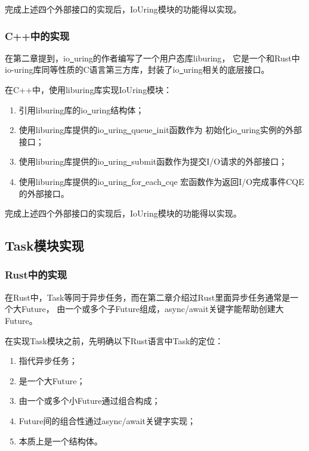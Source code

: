 \documentclass[supercite]{HustGraduPaper}
\theoremstyle{definition}
\begin{document}
完成上述四个外部接口的实现后，IoUring模块的功能得以实现。\par

\subsubsection{C++中的实现}

在第二章提到，io\underline{~}uring的作者编写了一个用户态库liburing\cite{liburing.org}，
它是一个和Rust中io-uring库同等性质的C语言第三方库，封装了io\underline{~}uring相关的底层接口。\par

在C++中，使用liburing库实现IoUring模块：

\begin{enumerate}[label={(\arabic*)}]
  \item 引用liburing库的io\underline{~}uring结构体；
  \item 使用liburing库提供的io\underline{~}uring\underline{~}queue\underline{~}init函数作为
    初始化io\underline{~}uring实例的外部接口；
  \item 使用liburing库提供的io\underline{~}uring\underline{~}submit函数作为提交I/O请求的外部接口；
  \item 使用liburing库提供的io\underline{~}uring\underline{~}for\underline{~}each\underline{~}cqe
    宏函数作为返回I/O完成事件CQE的外部接口。
\end{enumerate}

完成上述四个外部接口的实现后，IoUring模块的功能得以实现。\par

\subsection{Task模块实现}

\subsubsection{Rust中的实现}

在Rust中，Task等同于异步任务，而在第二章介绍过Rust里面异步任务通常是一个大Future，
由一个或多个子Future组成，async/await关键字能帮助创建大Future。\par

在实现Task模块之前，先明确以下Rust语言中Task的定位：
\begin{enumerate}[label={(\arabic*)}]
  \item 指代异步任务；
  \item 是一个大Future；
  \item 由一个或多个小Future通过组合构成；
  \item Future间的组合性通过async/await关键字实现；
  \item 本质上是一个结构体。
\end{enumerate}
\end{document}
